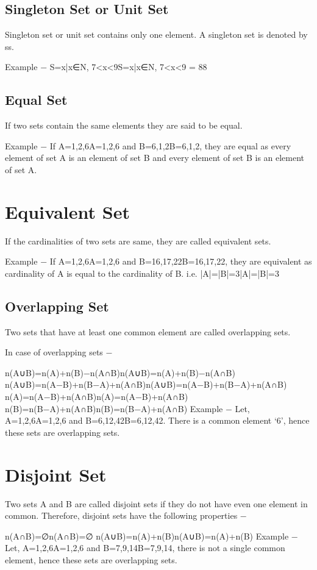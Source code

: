 \subsection{Singleton Set or Unit Set}
Singleton set or unit set contains only one element. A singleton set is denoted by {s}{s}.

Example − S={x|x∈N, 7<x<9}S={x|x∈N, 7<x<9} = {8}{8}
\subsection{Equal Set}
If two sets contain the same elements they are said to be equal.

Example − If A={1,2,6}A={1,2,6} and B={6,1,2}B={6,1,2}, they are equal as every element of set A is an element of set B and every element of set B is an element of set A.

\section{Equivalent Set}
If the cardinalities of two sets are same, they are called equivalent sets.

Example − If A={1,2,6}A={1,2,6} and B={16,17,22}B={16,17,22}, they are equivalent as cardinality of A is equal to the cardinality of B. i.e. |A|=|B|=3|A|=|B|=3
\subsection{Overlapping Set}
Two sets that have at least one common element are called overlapping sets.

In case of overlapping sets −

n(A∪B)=n(A)+n(B)−n(A∩B)n(A∪B)=n(A)+n(B)−n(A∩B)
n(A∪B)=n(A−B)+n(B−A)+n(A∩B)n(A∪B)=n(A−B)+n(B−A)+n(A∩B)
n(A)=n(A−B)+n(A∩B)n(A)=n(A−B)+n(A∩B)
n(B)=n(B−A)+n(A∩B)n(B)=n(B−A)+n(A∩B)
Example − Let, A={1,2,6}A={1,2,6} and B={6,12,42}B={6,12,42}. There is a common element ‘6’, hence these sets are overlapping sets.

\section{Disjoint Set}
Two sets A and B are called disjoint sets if they do not have even one element in common. Therefore, disjoint sets have the following properties −

n(A∩B)=∅n(A∩B)=∅
n(A∪B)=n(A)+n(B)n(A∪B)=n(A)+n(B)
Example − Let, A={1,2,6}A={1,2,6} and B={7,9,14}B={7,9,14}, there is not a single common element, hence these sets are overlapping sets.


